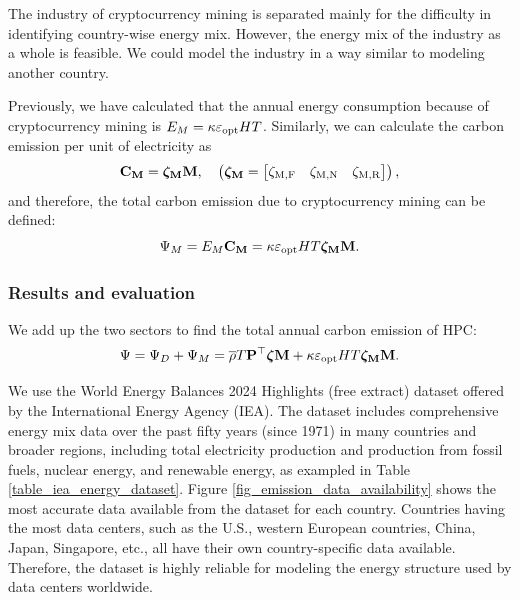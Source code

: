 \documentclass[12pt]{article}
\begin{document}
The industry of cryptocurrency mining is separated mainly for the difficulty in identifying country-wise energy mix. However, the energy mix of the industry as a whole is feasible. We could model the industry in a way similar to modeling another country.

Previously, we have calculated that the annual energy consumption because of cryptocurrency mining is $E_M = \kappa \varepsilon_{\rm opt} HT$. Similarly, we can calculate the carbon emission per unit of electricity as
\begin{equation}
	\vb{C_M} = \boldsymbol{\rm \zeta_M} \vb{M}, \quad
	\left(
		\boldsymbol{\rm \zeta_M} =
		\begin{bmatrix}
			\zeta_{\rm M, F} & \zeta_{\rm M, N} & \zeta_{\rm M, R} \\
		\end{bmatrix}
	\right),
\end{equation}
and therefore, the total carbon emission due to cryptocurrency mining can be defined:
\begin{equation}
	\Psi_M = E_M \vb{C_M} = \kappa \varepsilon_{\rm opt} HT \boldsymbol{\rm \zeta_M} \vb{M}.
\end{equation}

\subsubsection{Results and evaluation}

We add up the two sectors to find the total annual carbon emission of HPC:
\begin{equation}
	\Psi = \Psi_D + \Psi_M
	= \overline{\rho} T \vb{P}^\top \boldsymbol{\zeta} \vb{M}
		+ \kappa \varepsilon_{\rm opt} HT \boldsymbol{\rm \zeta_M} \vb{M}.
\end{equation}

We use the World Energy Balances 2024 Highlights (free extract) dataset \citep{energy_mix_dataset} offered by the International Energy Agency (IEA). The dataset includes comprehensive energy mix data over the past fifty years (since 1971) in many countries and broader regions, including total electricity production and production from fossil fuels, nuclear energy, and renewable energy, as exampled in Table \ref{table_iea_energy_dataset}. Figure \ref{fig_emission_data_availability} shows the most accurate data available from the dataset for each country. Countries having the most data centers, such as the U.S., western European countries, China, Japan, Singapore, etc., all have their own country-specific data available. Therefore, the dataset is highly reliable for modeling the energy structure used by data centers worldwide.
\end{document}
